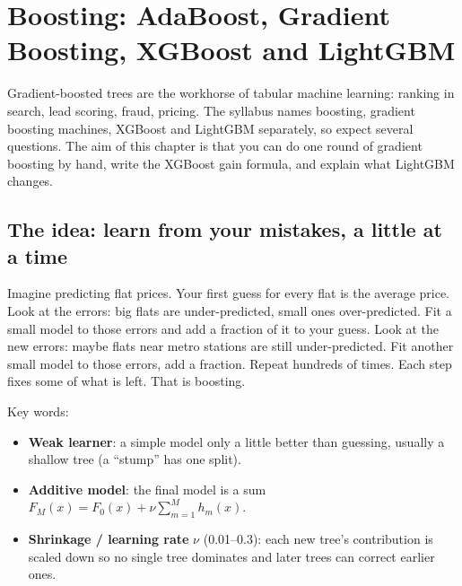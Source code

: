 \chapter{Boosting: AdaBoost, Gradient Boosting, XGBoost and LightGBM}

Gradient-boosted trees are the workhorse of tabular machine learning: ranking in search, lead scoring, fraud, pricing.
The syllabus names boosting, gradient boosting machines, XGBoost and LightGBM separately, so expect several questions.
The aim of this chapter is that you can do one round of gradient boosting by hand, write the XGBoost gain formula, and
explain what LightGBM changes.

\section{The idea: learn from your mistakes, a little at a time}
Imagine predicting flat prices. Your first guess for every flat is the average price. Look at the errors: big flats are
under-predicted, small ones over-predicted. Fit a small model to those errors and add a fraction of it to your guess. Look
at the new errors: maybe flats near metro stations are still under-predicted. Fit another small model to those errors, add a
fraction. Repeat hundreds of times. Each step fixes some of what is left. That is boosting.

Key words:
\begin{itemize}
\item \textbf{Weak learner}: a simple model only a little better than guessing, usually a shallow tree (a ``stump'' has one
  split).
\item \textbf{Additive model}: the final model is a sum $F_M(x) = F_0(x) + \nu\sum_{m=1}^M h_m(x)$.
\item \textbf{Shrinkage / learning rate} $\nu$ (0.01--0.3): each new tree's contribution is scaled down so no single tree
  dominates and later trees can correct earlier ones.
\end{itemize}

